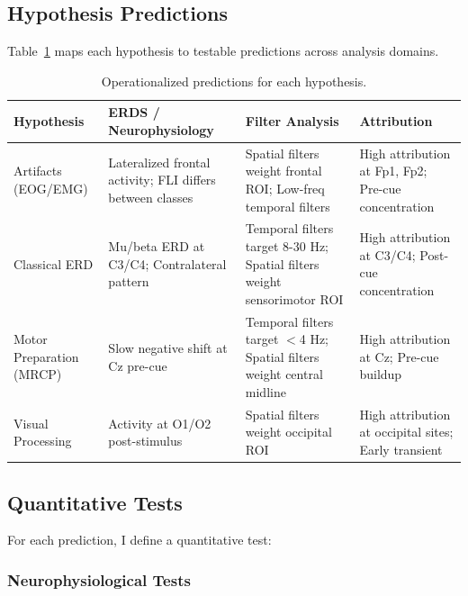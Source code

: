 \subsection{Hypothesis Predictions}
\label{subsec:methods_predictions}

Table~\ref{tab:hypothesis_tests} maps each hypothesis to testable predictions across analysis domains.

\begin{table}[htbp]
\centering
\caption{Operationalized predictions for each hypothesis.}
\label{tab:hypothesis_tests}
\small
\begin{tabular}{@{}p{2cm}p{3.5cm}p{3.5cm}p{3.5cm}@{}}
\toprule
\textbf{Hypothesis} & \textbf{ERDS / Neurophysiology} & \textbf{Filter Analysis} & \textbf{Attribution} \\
\midrule
Artifacts (EOG/EMG) & 
Lateralized frontal activity; FLI differs between classes &
Spatial filters weight frontal ROI; Low-freq temporal filters &
High attribution at Fp1, Fp2; Pre-cue concentration \\
\addlinespace
Classical ERD &
Mu/beta ERD at C3/C4; Contralateral pattern &
Temporal filters target 8-30 Hz; Spatial filters weight sensorimotor ROI &
High attribution at C3/C4; Post-cue concentration \\
\addlinespace
Motor Preparation (MRCP) &
Slow negative shift at Cz pre-cue &
Temporal filters target $<$4 Hz; Spatial filters weight central midline &
High attribution at Cz; Pre-cue buildup \\
\addlinespace
Visual Processing &
Activity at O1/O2 post-stimulus &
Spatial filters weight occipital ROI &
High attribution at occipital sites; Early transient \\
\bottomrule
\end{tabular}
\end{table}


\subsection{Quantitative Tests}
\label{subsec:methods_quant_tests}

For each prediction, I define a quantitative test:

\subsubsection{Neurophysiological Tests}

